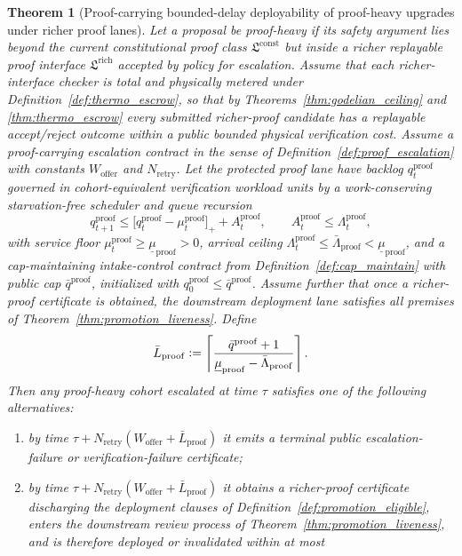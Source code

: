 \documentclass[11pt]{article}
\newtheorem{theorem}{Theorem}[section]
\theoremstyle{definition}
\newcommand{\1}{\mathbf{1}}
\newcommand{\Defeq}{\vcentcolon=}
\begin{document}
\begin{theorem}[Proof-carrying bounded-delay deployability of proof-heavy upgrades under richer proof lanes]\label{thm:proof_liveness}
Let a proposal be \emph{proof-heavy} if its safety argument lies beyond the current constitutional proof class $\mathfrak L^{\mathrm{const}}$ but inside a richer replayable proof interface $\mathfrak L^{\mathrm{rich}}$ accepted by policy for escalation. Assume that each richer-interface checker is total and physically metered under Definition~\ref{def:thermo_escrow}, so that by Theorems~\ref{thm:godelian_ceiling} and \ref{thm:thermo_escrow} every submitted richer-proof candidate has a replayable accept/reject outcome within a public bounded physical verification cost. Assume a proof-carrying escalation contract in the sense of Definition~\ref{def:proof_escalation} with constants $W_{\mathrm{offer}}$ and $N_{\mathrm{retry}}$. Let the protected proof lane have backlog $q_t^{\mathrm{proof}}$ governed in cohort-equivalent verification workload units by a work-conserving starvation-free scheduler and queue recursion
\[
q_{t+1}^{\mathrm{proof}}\le \bigl[q_t^{\mathrm{proof}}-\mu_t^{\mathrm{proof}}\bigr]_+ + A_t^{\mathrm{proof}},
\qquad
A_t^{\mathrm{proof}}\le \Lambda_t^{\mathrm{proof}},
\]
with service floor $\mu_t^{\mathrm{proof}}\ge \underline\mu_{\mathrm{proof}}>0$, arrival ceiling $\Lambda_t^{\mathrm{proof}}\le \bar\Lambda_{\mathrm{proof}}<\underline\mu_{\mathrm{proof}}$, and a cap-maintaining intake-control contract from Definition~\ref{def:cap_maintain} with public cap $\bar q^{\mathrm{proof}}$, initialized with $q_0^{\mathrm{proof}}\le \bar q^{\mathrm{proof}}$. Assume further that once a richer-proof certificate is obtained, the downstream deployment lane satisfies all premises of Theorem~\ref{thm:promotion_liveness}. Define
\[
\bar L_{\mathrm{proof}}\Defeq\left\lceil \frac{\bar q^{\mathrm{proof}}+1}{\underline\mu_{\mathrm{proof}}-\bar\Lambda_{\mathrm{proof}}} \right\rceil.
\]
Then any proof-heavy cohort escalated at time $\tau$ satisfies one of the following alternatives:
\begin{enumerate}[label=(\roman*), leftmargin=2em]
  \item by time $\tau+N_{\mathrm{retry}}(W_{\mathrm{offer}}+\bar L_{\mathrm{proof}})$ it emits a terminal public escalation-failure or verification-failure certificate;
  \item by time $\tau+N_{\mathrm{retry}}(W_{\mathrm{offer}}+\bar L_{\mathrm{proof}})$ it obtains a richer-proof certificate discharging the deployment clauses of Definition~\ref{def:promotion_eligible}, enters the downstream review process of Theorem~\ref{thm:promotion_liveness}, and is therefore deployed or invalidated within at most

\end{enumerate}
\end{theorem}
\end{document}
